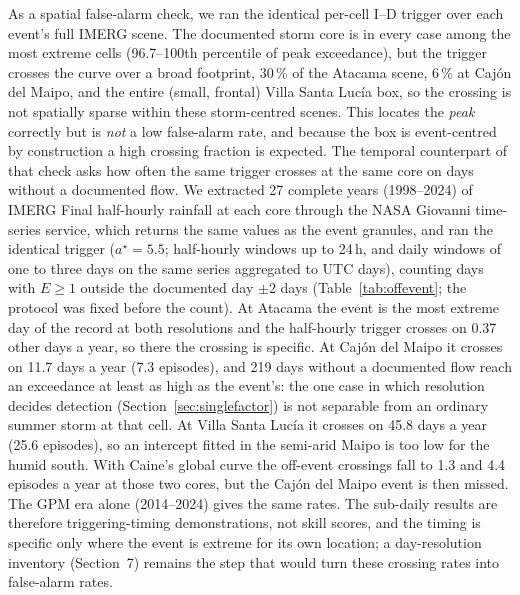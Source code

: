 \documentclass[authoryear,preprint,review,12pt]{elsarticle}
\begin{document}
As a spatial false-alarm check, we ran the identical per-cell I--D trigger over each
event's full IMERG scene. The documented storm core is in every case among the most
extreme cells (96.7--100th percentile of peak exceedance), but the trigger crosses
the curve over a broad footprint, 30\,\% of the Atacama scene, 6\,\% at Caj\'on del
Maipo, and the entire (small, frontal) Villa Santa Luc\'ia box, so the crossing is
not spatially sparse within these storm-centred scenes. This locates the \emph{peak}
correctly but is \emph{not} a low false-alarm rate, and because the box is
event-centred by construction a high crossing fraction is expected. The temporal counterpart of that check asks how often the same trigger crosses at
the same core on days without a documented flow. We extracted 27 complete years
(1998--2024) of IMERG Final half-hourly rainfall at each core through the NASA
Giovanni time-series service, which returns the same values as the event granules,
and ran the identical trigger ($a^\star=5.5$; half-hourly windows up to 24\,h, and
daily windows of one to three days on the same series aggregated to UTC days),
counting days with $E\geq1$ outside the documented day $\pm2$ days
(Table~\ref{tab:offevent}; the protocol was fixed before the count). At Atacama the
event is the most extreme day of the record at both resolutions and the half-hourly
trigger crosses on 0.37 other days a year, so there the crossing is specific. At
Caj\'on del Maipo it crosses on 11.7 days a year (7.3 episodes), and 219 days
without a documented flow reach an exceedance at least as high as the event's: the
one case in which resolution decides detection (Section~\ref{sec:singlefactor}) is
not separable from an ordinary summer storm at that cell. At Villa Santa Luc\'ia it
crosses on 45.8 days a year (25.6 episodes), so an intercept fitted in the
semi-arid Maipo is too low for the humid south. With Caine's global curve the
off-event crossings fall to 1.3 and 4.4 episodes a year at those two cores, but the
Caj\'on del Maipo event is then missed. The GPM era alone (2014--2024) gives the
same rates. The sub-daily results are therefore triggering-timing demonstrations,
not skill scores, and the timing is specific only where the event is extreme for
its own location; a day-resolution inventory (Section~7) remains the step that
would turn these crossing rates into false-alarm rates.
\end{document}
